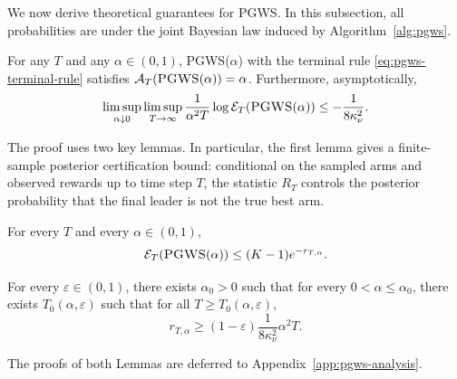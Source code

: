\documentclass[10pt]{article}
\newcommand{\ouralg}{{\textnormal{\textsc{PGWS}}}}
\theoremstyle{plain}
\begin{document}
We now derive theoretical guarantees for \ouralg{}. In
this subsection, all probabilities are under the joint Bayesian law induced by
Algorithm~\ref{alg:pgws}.

\begin{theorem}[Upper Bound for \ouralg{}]
\label{thm:pgws-upper}
For any $T$ and any $\alpha\in(0,1)$, \ouralg{}($\alpha$) with the terminal rule \eqref{eq:pgws-terminal-rule} satisfies
$\mathcal A_T(\ouralg(\alpha))=\alpha$.
Furthermore, asymptotically,
\begin{equation}
    \limsup_{\alpha\downarrow0}
    \limsup_{T\to\infty}
    \frac{1}{\alpha^2T}\log \mathcal E_T(\ouralg(\alpha))
    \le
    - \frac{1}{8\kappa_\nu^2}.\label{eqn:ub}
\end{equation}
\end{theorem}
The proof uses two key lemmas. In particular, the first lemma gives a finite-sample posterior
certification bound: conditional on the sampled arms and observed rewards up to time step $T$, the statistic $R_T$
controls the posterior probability that the final leader is not the true best arm.

\begin{lemma}
\label{lem:pgws-certification}
For every $T$ and every $\alpha\in(0,1)$,
\[
    \mathcal E_T(\ouralg(\alpha))
    \le
    (K-1)e^{-r_{T,\alpha}}.
\]
\end{lemma}



\begin{lemma}
\label{lem:pgws-threshold-lower}
For every $\varepsilon\in(0,1)$, there exists $\alpha_0>0$ such that for every
$0<\alpha\le \alpha_0$, there exists $T_0(\alpha,\varepsilon)$ such that for all
$T\ge T_0(\alpha,\varepsilon)$,
\[
    r_{T,\alpha}
    \ge
    (1-\varepsilon) \frac{1}{8\kappa_\nu^2} \alpha^2T.
\]
\end{lemma}
The proofs of both Lemmas are deferred to
Appendix~\ref{app:pgws-analysis}.
\end{document}
